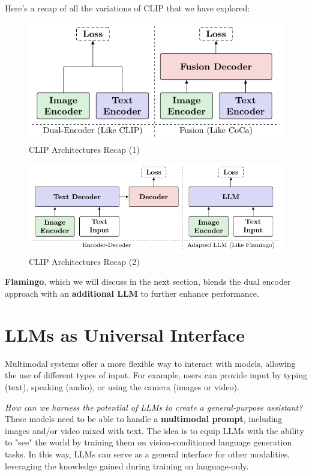 Here's a recap of all the variations of CLIP that we have explored:

\begin{figure}[!htbp]
    \centering
    \includegraphics[width=0.8\linewidth]{tikz/chapter11 - CLIP Architectures Recap 1.pdf}
    \caption{CLIP Architectures Recap (1)}
\end{figure}

\newpage
\begin{figure}[!htbp]
    \centering
    \includegraphics[width=\linewidth]{tikz/chapter11 - CLIP Architectures Recap 2.pdf}
    \caption{CLIP Architectures Recap (2)}
\end{figure}

\textbf{Flamingo}, which we will discuss in the next section, blends the dual encoder approach with an \textbf{additional LLM} to further enhance performance.

\section{LLMs as Universal Interface}

Multimodal systems offer a more flexible way to interact with models, allowing the use of different types of input. For example, users can provide input by typing (text), speaking (audio), or using the camera (images or video).

\textit{How can we harness the potential of LLMs to create a general-purpose assistant?} These models need to be able to handle a \textbf{multimodal prompt}, including images and/or video mixed with text. The idea is to equip LLMs with the ability to "see" the world by training them on vision-conditioned language generation tasks. In this way, LLMs can serve as a general interface for other modalities, leveraging the knowledge gained during training on language-only.

